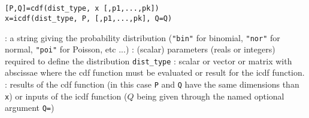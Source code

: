 \begin{mandesc}
   \\
   \\
\end{mandesc}
\begin{calling_sequence}
\begin{verbatim}
[P,Q]=cdf(dist_type, x [,p1,...,pk])  
x=icdf(dist_type, P, [,p1,...,pk], Q=Q)
\end{verbatim}
\end{calling_sequence}
\begin{parameters}
  \begin{varlist}
   : a string giving the probability distribution (\verb!"bin"! for binomial, \verb!"nor"!
   for normal, \verb!"poi"! for Poisson, etc ...)
   : (scalar) parameters (reals or integers) required to define the distribution \verb!dist_type!
    : scalar or vector or matrix with abscissae where the cdf function must be evaluated or
               result for the icdf function.
   : results of the cdf function (in this case \verb+P+ and \verb+Q+ have the same dimensions than \verb+x+)
                or inputs of the icdf function ($Q$ being given through the named optional argument \verb+Q=+)
  \end{varlist}
  \end{parameters}
  
